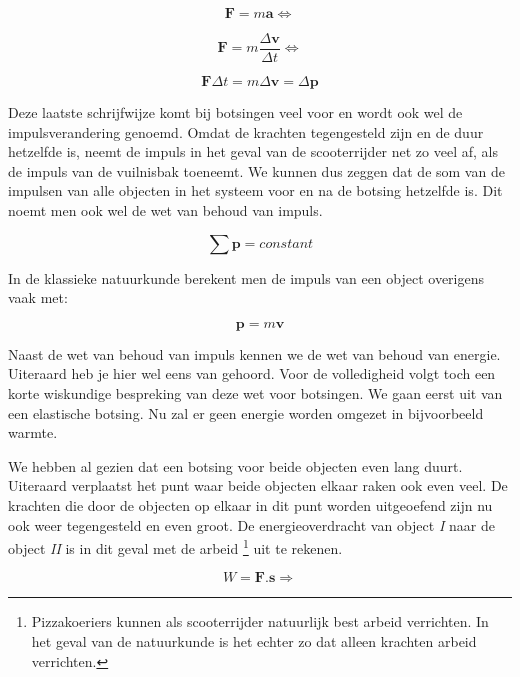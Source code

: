 \begin{equation}
\mathbf{F}=m\mathbf{a}\Longleftrightarrow
\end{equation}


\begin{equation}
\mathbf{F}=m\frac{\Delta\mathbf{v}}{\Delta t}\Longleftrightarrow
\end{equation}


\begin{equation}
\mathbf{F}\Delta t=m\Delta\mathbf{v}=\Delta\mathbf{p}
\end{equation}


Deze laatste schrijfwijze komt bij botsingen veel voor en wordt ook
wel de impulsverandering genoemd. Omdat de krachten tegengesteld zijn
en de duur hetzelfde is, neemt de impuls in het geval van de scooterrijder
net zo veel af, als de impuls van de vuilnisbak toeneemt. We kunnen
dus zeggen dat de som van de impulsen van alle objecten in het systeem
voor en na de botsing hetzelfde is. Dit noemt men ook wel de wet van
behoud van impuls. 

\begin{equation}
\sum\mathbf{p}=constant
\end{equation}


In de klassieke natuurkunde berekent men de impuls van een object
overigens vaak met:

\begin{equation}
\mathbf{p}=m\mathbf{v}
\end{equation}


Naast de wet van behoud van impuls kennen we de wet van behoud van
energie. Uiteraard heb je hier wel eens van gehoord. Voor de volledigheid
volgt toch een korte wiskundige bespreking van deze wet voor botsingen.
We gaan eerst uit van een elastische botsing. Nu zal er geen energie
worden omgezet in bijvoorbeeld warmte.

We hebben al gezien dat een botsing voor beide objecten even lang duurt.
Uiteraard verplaatst het punt waar beide objecten elkaar raken ook even
veel. De krachten die door de objecten op elkaar in dit punt worden
uitgeoefend zijn nu ook weer tegengesteld en even groot. De
energieoverdracht van object \emph{I} naar de object \emph{II} is in dit
geval met de arbeid \footnote{Pizzakoeriers kunnen als scooterrijder
natuurlijk best arbeid verrichten. In het geval van de natuurkunde is
het echter zo dat alleen krachten arbeid verrichten.} uit te rekenen.

\begin{equation}
W=\mathbf{F}.\mathbf{s}\Longrightarrow
\end{equation}


